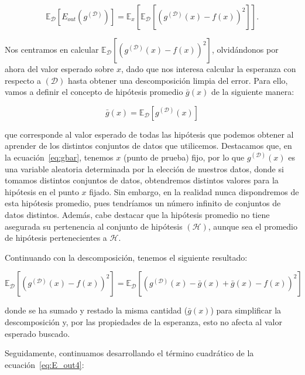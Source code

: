 \begin{equation}\label{eq:E_out3}
    \mathbb{E}_{\mathcal{D}}[E_{out}(g^{\mathcal{(D)}})] = \mathbb{E}_{x}[\mathbb{E}_{\mathcal{D}}[{(g^{\mathcal{(D)}}(x) - f(x))}^2]].
\end{equation}\newline

Nos centramos en calcular $\mathbb{E}_{\mathcal{D}}[{(g^{\mathcal{(D)}}(x) - f(x))}^2]$, olvidándonos por ahora del valor esperado sobre $x$, dado que nos interesa calcular la esperanza con respecto a $\mathcal{(D)}$ hasta obtener una descomposición limpia del error. Para ello, vamos a definir el concepto de hipótesis promedio $\bar{g}(x)$ de la siguiente manera:

\begin{equation}\label{eq:gbar}
    \bar{g}(x) = \mathbb{E}_{\mathcal{D}}[g^{\mathcal{(D)}}(x)]
\end{equation}

que corresponde al valor esperado de todas las hipótesis que podemos obtener al aprender de los distintos conjuntos de datos que utilicemos. Destacamos que, en la ecuación~\eqref{eq:gbar}, tenemos $x$ (punto de prueba) fijo, por lo que $g^{\mathcal{(D)}}(x)$ es una variable aleatoria determinada por la elección de nuestros datos, donde si tomamos distintos conjuntos de datos, obtendremos distintos valores para la hipótesis en el punto $x$ fijado. Sin embargo, en la realidad nunca dispondremos de esta hipótesis promedio, pues tendríamos un número infinito de conjuntos de datos distintos. Además, cabe destacar que la hipótesis promedio no tiene asegurada su pertenencia al conjunto de hipótesis $\mathcal{(H)}$, aunque sea el promedio de hipótesis pertenecientes a $\mathcal{H}$.\newline

Continuando con la descomposición, tenemos el siguiente resultado:

\begin{equation}\label{eq:E_out4}
    \mathbb{E}_{\mathcal{D}}[{(g^{\mathcal{(D)}}(x) - f(x))}^2] = \mathbb{E}_{\mathcal{D}}[{(g^{\mathcal{(D)}}(x) - \bar{g}(x) + \bar{g}(x) - f(x))}^2]
\end{equation}

donde se ha sumado y restado la misma cantidad ($\bar{g}(x)$) para simplificar la descomposición y, por las propiedades de la esperanza, esto no afecta al valor esperado buscado.\newline

Seguidamente, continuamos desarrollando el término cuadrático de la ecuación~\eqref{eq:E_out4}:

